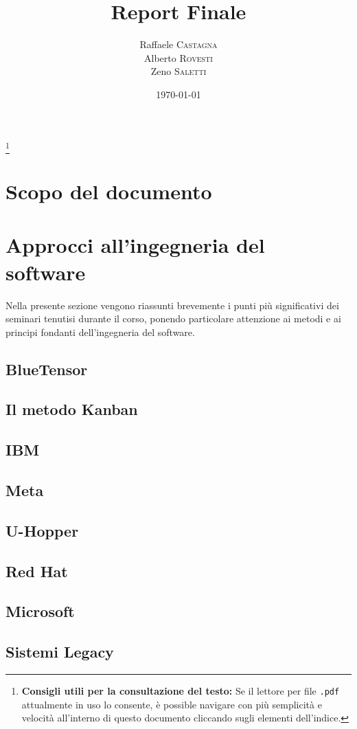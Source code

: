 \documentclass[11pt, a4paper]{article}
\title{Report Finale}
\author{Raffaele \textsc{Castagna}\\
Alberto \textsc{Rovesti}\\
Zeno \textsc{Saletti}}
\date{\today}
\theoremstyle{definition}
\newcommand\blfootnote[1]{%
  \begingroup
  \renewcommand\thefootnote{}\footnote{#1}%
  \addtocounter{footnote}{-1}%
  \endgroup
}
\begin{document}


\tableofcontents\blfootnote{\textbf{Consigli utili per la consultazione del testo:} Se il lettore per file \texttt{.pdf} attualmente in uso lo consente, è possible navigare con più semplicità e velocità all'interno di questo documento cliccando sugli elementi dell'indice.}


\newpage
\section*{Scopo del documento}




\newpage
\section{Approcci all'ingegneria del software}
Nella presente sezione vengono riassunti brevemente i punti più significativi
dei seminari tenutisi durante il corso, ponendo particolare attenzione ai
metodi e ai principi fondanti dell'ingegneria del software.

\subsection{BlueTensor}
\subsection{Il metodo Kanban}
\subsection{IBM}
\subsection{Meta}
\subsection{U-Hopper}
\subsection{Red Hat}
\subsection{Microsoft}
\subsection{Sistemi Legacy}
\end{document}
